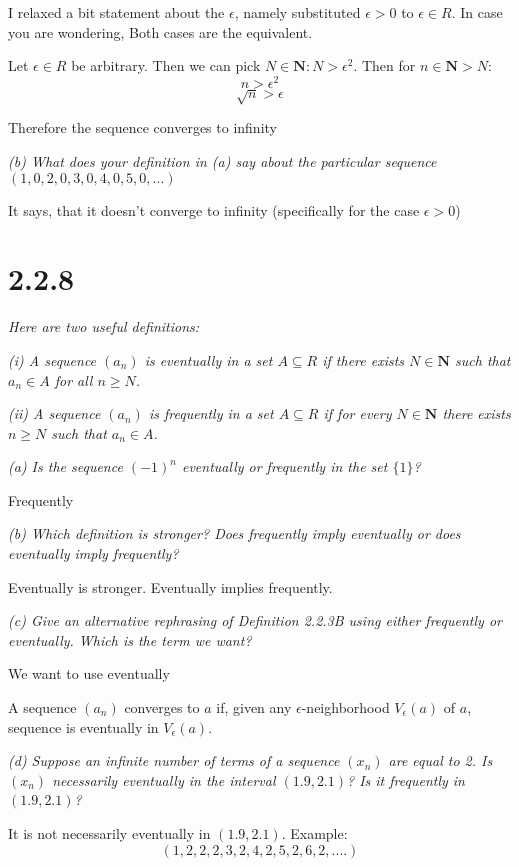 \documentclass[11pt,oneside,titlepage]{book}
\begin{document}
I relaxed a bit statement about the $\epsilon$, namely substituted $\epsilon > 0$ to
$\epsilon \in R$. In case you are wondering, Both cases are the equivalent.

Let $\epsilon \in R$ be arbitrary. Then we can pick $N \in \textbf{N}: N > \epsilon ^ 2$.
Then for $n \in \textbf{N} > N$:
$$n > \epsilon ^ 2$$
$$\sqrt{n} > \epsilon$$

Therefore the sequence converges to infinity

\textit{(b) What does your definition in (a) say about the particular sequence
  $(1, 0, 2, 0, 3, 0, 4, 0, 5, 0, ...)$}

It says, that it doesn't converge to infinity (specifically for the case $\epsilon > 0$)

\section*{2.2.8}
\textit{Here are two useful definitions:}

\textit{(i) A sequence $(a_n)$ is eventually in a set $A \subseteq R$ if there exists
  $N \in \textbf{N}$ such that $a_n \in A$ for all $n \geq N$.}

\textit{(ii) A sequence $(a_n)$ is frequently in a set $A \subseteq R$ if for every
  $N \in \textbf{N}$ there exists $n \geq N$ such that $a_n \in A$.
}

\textit{(a) Is the sequence $(-1)^n$ eventually or frequently in the set $\{1\}$?}

Frequently

\textit{(b) Which definition is stronger? Does frequently imply eventually or does
  eventually imply frequently?}

Eventually is stronger. Eventually implies frequently.

\textit{(c) Give an alternative rephrasing of Definition 2.2.3B using either frequently
  or eventually. Which is the term we want?}

We want to use eventually

A sequence $(a_n)$ converges to $a$ if, given any $\epsilon$-neighborhood $V_\epsilon(a)$ of
$a$, sequence is eventually in $V_\epsilon(a)$.

\textit{(d) Suppose an infinite number of terms of a sequence $(x_n)$ are equal to 2.
  Is $(x_n)$ necessarily eventually in the interval $(1.9, 2.1)$? Is it frequently in
  $(1.9, 2.1)$?}

It is not necessarily eventually  in $(1.9, 2.1)$. Example:
$$(1, 2, 2, 2, 3, 2, 4, 2, 5, 2, 6, 2, ....)$$
\end{document}
